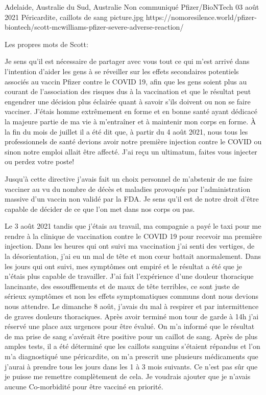 {Adelaide, Australie du Sud, Australie}
{Non communiqué}
{Pfizer/BioNTech}
{03 août 2021}
{Péricardite, caillots de sang}
{picture.jpg}
{https://nomoresilence.world/pfizer-biontech/scott-mcwilliams-pfizer-severe-adverse-reaction/}
{

\normalsize

Les propres mots de Scott:

Je sens qu’il est nécessaire de partager avec vous tout ce qui m’est arrivé dans
l’intention d’aider les gens à se réveiller sur les effets secondaires
potentiels associés au vaccin Pfizer contre le COVID 19, afin que les gens
soient plus au courant de l’association des risques dus à la vaccination et que
le résultat peut engendrer une décision plus éclairée quant à savoir s’ils
doivent ou non se faire vacciner. J’étais homme extrêmement en forme et en bonne
santé ayant dédicacé la majeure partie de ma vie à m’entraîner et à maintenir
mon corps en forme. À la fin du mois de juillet il a été dit que, à partir du 4
août 2021, nous tous les professionnels de santé devions avoir notre première
injection contre le COVID ou sinon notre emploi allait être affecté. J’ai reçu
un ultimatum, faites vous injecter ou perdez votre poste!

Jusqu’à cette directive j’avais fait un choix personnel de m’abstenir de me
faire vacciner au vu du nombre de décès et maladies provoqués par
l’administration massive d’un vaccin non validé par la FDA. Je sens qu’il est de
notre droit d’être capable de décider de ce que l’on met dans nos corps ou pas.

Le 3 août 2021 tandis que j’étais au travail, ma compagnie a payé le taxi pour
me rendre à la clinique de vaccination contre le COVID 19 pour recevoir ma
première injection. Dans les heures qui ont suivi ma vaccination j’ai senti des
vertiges, de la désorientation, j’ai eu un mal de tête et mon cœur battait
anormalement. Dans les jours qui ont suivi, mes symptômes ont empiré et le
résultat a été que je n’étais plus capable de travailler. J’ai fait l’expérience
d’une douleur thoracique lancinante, des essoufflements et de maux de tête
terribles, ce sont juste de sérieux symptômes et non les effets symptomatiques
communs dont nous devions nous attendre. Le dimanche 8 août, j’avais du mal à
respirer et par intermittence de graves douleurs thoraciques. Après avoir
terminé mon tour de garde à 14h j’ai réservé une place aux urgences pour être
évalué. On m’a informé que le résultat de ma prise de sang s’avérait être
positive pour un caillot de sang. Après de plus amples tests, il a été déterminé
que les caillots sanguins s’étaient répandus et l’on m’a diagnostiqué une
péricardite, on m’a prescrit une plusieurs médicaments que j’aurai à prendre
tous les jours dans les 1 à 3 mois suivants. Ce n’est pas sûr que je puisse me
remettre complètement de cela. Je voudrais ajouter que je n’avais aucune
Co-morbidité pour être vacciné en priorité.

}
